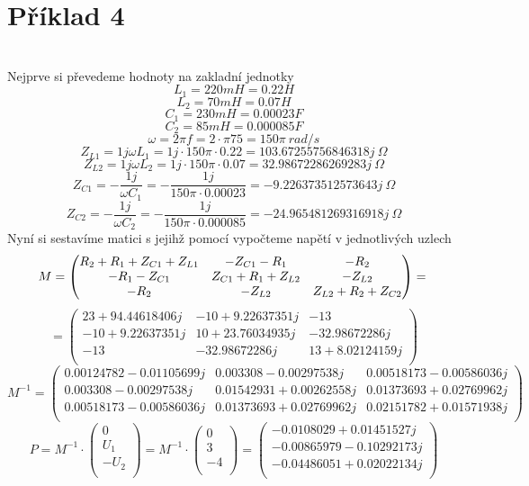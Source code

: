 \section{Příklad 4}
\\
Nejprve si převedeme hodnoty na zakladní jednotky\\
\[
  L_1 = 220 mH = 0.22 H
\]
\[
  L_2 = 70 mH = 0.07 H
\]
\[
  C_1 = 230 mH = 0.00023 F
\]
\[
  C_2 = 85 mH = 0.000085 F
\]
\[
  \omega = 2\pi f 
  = 2 \cdot \pi 75
  = 150\pi \ rad/s
\]
\[
  Z_{L1} = 1j \omega L_1
  = 1j \cdot 150\pi \cdot 0.22 
  = 103.67255756846318j\ \Omega
\]
\[
  Z_{L2} = 1j \omega L_2
  = 1j \cdot 150\pi \cdot 0.07 
  = 32.98672286269283j \ \Omega
\]
\[
  Z_{C1} = -\displaystyle\frac{1j}{\omega C_1}
  = - \displaystyle\frac{1j}{150\pi \cdot 0.00023}
  = - 9.226373512573643j\ \Omega
\]
\[
  Z_{C2} = -\displaystyle\frac{1j}{\omega C_2}
  = - \displaystyle\frac{1j}{150\pi \cdot 0.000085}
  = - 24.965481269316918j\ \Omega
\]
Nyní si sestavíme matici s jejihž pomocí vypočteme napětí v jednotlivých uzlech
\[
  M =
  \begin{pmatrix}
    R_2+R_1+Z_{C1}+Z_{L1} & -Z_{C1}-R_1 & -R_2\\
    -R_1-Z_{C1} & Z_{C1}+R_1+Z_{L2} & -Z_{L2}\\
    -R_2 & -Z_{L2} & Z_{L2}+R_2+Z_{C2}\\
  \end{pmatrix}
  =\\
\]
\[
  =
  \begin{pmatrix}
    23+94.44618406j & -10 +9.22637351j & -13\\
    -10 +9.22637351j & 10 +23.76034935j & -32.98672286j\\
    -13 & -32.98672286j & 13 +8.02124159j\\
  \end{pmatrix}
\]
\[
  M^{-1}
  =
  \begin{pmatrix}
    0.00124782-0.01105699j & 0.003308  -0.00297538j & 0.00518173-0.00586036j\\
   0.003308  -0.00297538j & 0.01542931+0.00262558j & 0.01373693+0.02769962j\\
    0.00518173-0.00586036j & 0.01373693+0.02769962j & 0.02151782+0.01571938j\\
  \end{pmatrix}
\]
\[
P = M^{-1} \cdot 
\begin{pmatrix}
  0\\
  U_1\\
  -U_2\\
\end{pmatrix}
= M^{-1}\cdot
\begin{pmatrix}
  0\\
  3\\
  -4\\
\end{pmatrix}
= 
\begin{pmatrix}
-0.0108029 +0.01451527j\\
 -0.00865979-0.10292173j\\ 
 -0.04486051+0.02022134j\\ 
\end{pmatrix}
\]
